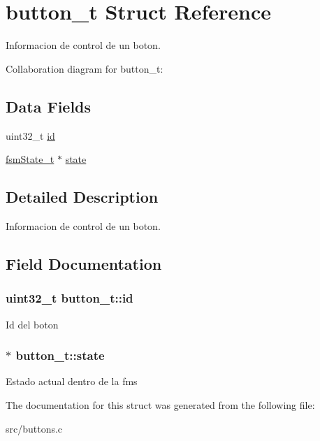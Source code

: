 \hypertarget{structbutton__t}{}\section{button\+\_\+t Struct Reference}
\label{structbutton__t}


Informacion de control de un boton.  




Collaboration diagram for button\+\_\+t\+:
\subsection*{Data Fields}
\begin{DoxyCompactItemize}
\item 
uint32\+\_\+t \hyperlink{structbutton__t_a90c93dd74cd5247d27e0fe8564472274}{id}
\item 
\hyperlink{structfsmState}{fsm\+State\+\_\+t} $\ast$ \hyperlink{structbutton__t_a0df217f65dfeed14e32f4748a6a341e2}{state}
\end{DoxyCompactItemize}


\subsection{Detailed Description}
Informacion de control de un boton. 

\subsection{Field Documentation}
\subsubsection[{\texorpdfstring{id}{id}}]{\setlength{\rightskip}{0pt plus 5cm}uint32\+\_\+t button\+\_\+t\+::id}\hypertarget{structbutton__t_a90c93dd74cd5247d27e0fe8564472274}{}\label{structbutton__t_a90c93dd74cd5247d27e0fe8564472274}
Id del boton 
\subsubsection[{\texorpdfstring{state}{state}}]{$\ast$ button\+\_\+t\+::state}\hypertarget{structbutton__t_a0df217f65dfeed14e32f4748a6a341e2}{}\label{structbutton__t_a0df217f65dfeed14e32f4748a6a341e2}
Estado actual dentro de la fms 

The documentation for this struct was generated from the following file\+:\begin{DoxyCompactItemize}
\item 
src/buttons.\+c\end{DoxyCompactItemize}
